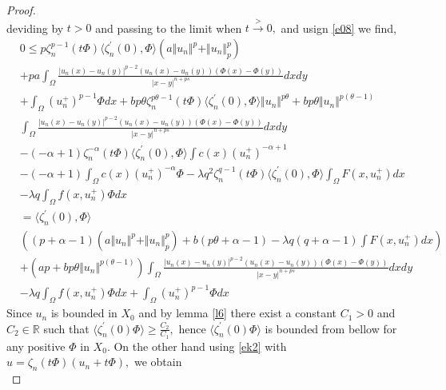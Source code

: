 \documentclass[10pt,a4paper]{amsart}
\begin{document}
\begin{proof}
\begin{equation}
\end{equation} 
deviding by $ t >0$ and passing to the limit when $ t \xrightarrow{>} 0,$ and usign \ref{e08} we find,
\begin{equation}
\begin{aligned}
& 0\leq p\zeta^{p-1}_{n}(t\Phi)\langle \zeta^{\prime}_{n}(0), \Phi\rangle\left( a \Vert u_n \Vert^p + \Vert u_n \Vert_{p}^{p}\right)\\
&+pa\int_{\Omega}\frac{\vert u_n(x) -u_n(y)\vert^{p-2}(u_n(x) -u_n(y))(\Phi(x) -\Phi(y))}{\vert x -y\vert^{n  +ps}}dxdy \\
&+\int_{\Omega}(u_n^+)^{p -1}\Phi dx +b p\theta\zeta^{p\theta-1}_{n}(t\Phi)\langle \zeta^{\prime}_{n}(0), \Phi\rangle\Vert u_n \Vert^{p\theta} 
+b p\theta\Vert u_n\Vert^{p(\theta -1)}\\
&\int_{\Omega}\frac{\vert u_n(x) -u_n(y)\vert^{p-2}(u_n(x) -u_n(y))(\Phi(x) -\Phi(y))}{\vert x -y\vert^{n  +ps}}dxdy\\
&-(-\alpha +1)\zeta^{-\alpha}_{n}(t\Phi)\langle \zeta^{\prime}_{n}(0), \Phi\rangle\int c(x)(u_n^+)^{-\alpha+1}\\
& -(-\alpha +1)\int_{\Omega}c(x)(u_n^+)^{-\alpha}\Phi -\lambda q^{2}\zeta^{q-1}_{n}(t\Phi)\langle \zeta^{\prime}_{n}(0), \Phi\rangle\int_{\Omega}F(x,u_n^+)dx\\
&-\lambda q\int_{\Omega}f(x,u_n^+)\Phi dx\\
&= \langle \zeta^{\prime}_{n}(0), \Phi\rangle\\
&\left( (p +\alpha -1)\left( a \Vert u_n \Vert^p + \Vert u_n \Vert_{p}^{p}\right) +b(p\theta +\alpha -1) -\lambda q(q +\alpha -1)\int F(x,u_n^+)dx\right)\\
& +\left(a p +b p\theta\Vert u_n\Vert^{p(\theta -1)}\right)\int_{\Omega}\frac{\vert u_n(x) -u_n(y)\vert^{p-2}(u_n(x) -u_n(y))(\Phi(x) -\Phi(y))}{\vert x -y\vert^{n  +ps}}dxdy \\
&-\lambda q\int_{\Omega}f(x,u_n^+)\Phi dx +\int_{\Omega}(u_n^+)^{p -1}\Phi dx
\end{aligned}
\end{equation}
Since $ u_n$ is bounded in $ X_0$ and by lemma \ref{l6} there exist a constant 
$ C_1 >0$ and $ C_2 \in \mathbb{R}$ such that $ \langle \zeta^{\prime}_{n}(0) \Phi\rangle \geq \frac{C_2}{C_1},$ 
hence $ \langle \zeta^{\prime}_{n}(0) \Phi\rangle$ is bounded from bellow for any positive $ \Phi$ in $ X_0.$\newline
On the other hand using \ref{ek2} with $ u =\zeta_n(t\Phi)(u_n +t\Phi),$ we obtain
\begin{equation}

\end{equation}
\end{proof}
\end{document}
